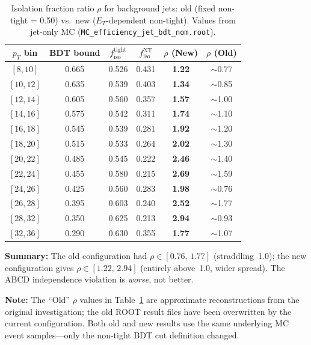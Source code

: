 \documentclass[11pt,a4paper]{article}
\begin{document}
\begin{table}[H]
\centering
\caption{Isolation fraction ratio $\rho$ for background jets: old
         (fixed non-tight = 0.50) vs.\ new ($E_T$-dependent non-tight).
         Values from jet-only MC (\texttt{MC\_efficiency\_jet\_bdt\_nom.root}).}
\label{tab:isofrac}
\begin{tabular}{@{}cccccc@{}}
\toprule
$p_T$ bin & BDT bound & $f_{\mathrm{iso}}^{\mathrm{tight}}$ &
$f_{\mathrm{iso}}^{\mathrm{NT}}$ & $\rho$ (New) & $\rho$ (Old) \\
\midrule
$[8,10]$   & 0.665 & 0.526 & 0.431 & \textbf{1.22} & $\sim$0.77 \\
$[10,12]$  & 0.635 & 0.539 & 0.403 & \textbf{1.34} & $\sim$0.85 \\
$[12,14]$  & 0.605 & 0.560 & 0.357 & \textbf{1.57} & $\sim$1.00 \\
$[14,16]$  & 0.575 & 0.542 & 0.311 & \textbf{1.74} & $\sim$1.10 \\
$[16,18]$  & 0.545 & 0.539 & 0.281 & \textbf{1.92} & $\sim$1.20 \\
$[18,20]$  & 0.515 & 0.533 & 0.264 & \textbf{2.02} & $\sim$1.30 \\
$[20,22]$  & 0.485 & 0.545 & 0.222 & \textbf{2.46} & $\sim$1.40 \\
$[22,24]$  & 0.455 & 0.580 & 0.215 & \textbf{2.69} & $\sim$1.59 \\
$[24,26]$  & 0.425 & 0.560 & 0.283 & \textbf{1.98} & $\sim$0.76 \\
$[26,28]$  & 0.395 & 0.603 & 0.240 & \textbf{2.52} & $\sim$1.77 \\
$[28,32]$  & 0.350 & 0.625 & 0.213 & \textbf{2.94} & $\sim$0.93 \\
$[32,36]$  & 0.290 & 0.630 & 0.355 & \textbf{1.77} & $\sim$1.07 \\
\bottomrule
\end{tabular}
\end{table}

\textbf{Summary:} The old configuration had $\rho \in [0.76,\,1.77]$
(straddling~1.0); the new configuration gives $\rho \in [1.22,\,2.94]$
(entirely above~1.0, wider spread). The ABCD independence violation is
\emph{worse}, not better.

\textbf{Note:} The ``Old'' $\rho$ values in Table~\ref{tab:isofrac} are
approximate reconstructions from the original investigation; the old ROOT
result files have been overwritten by the current configuration. Both old
and new results use the same underlying MC event samples---only the
non-tight BDT cut definition changed.
\end{document}
